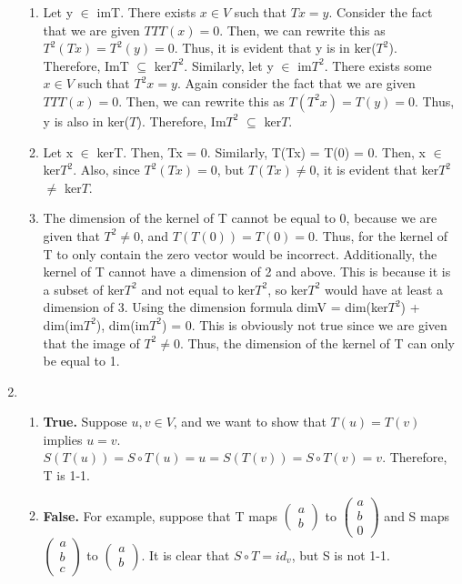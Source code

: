 \documentclass{article}
\begin{document}
\begin{enumerate}
\begin{enumerate}
\item Let y $\in$ imT. There exists $x \in V$ such that $Tx = y$. Consider the fact that we are given $TTT(x) = 0$. Then, we can rewrite this as $T^2(Tx) = T^2(y) = 0$. Thus, it is evident that y is in ker($T^2$). Therefore, ImT $\subseteq$ ker$T^2$. Similarly, let y $\in$ im$T^2$. There exists some $x \in V$ such that $T^2x = y$. Again consider the fact that we are given $TTT(x) = 0$. Then, we can rewrite this as $T(T^2x) = T(y) = 0$. Thus, y is also in ker($T$). Therefore, Im$T^2$ $\subseteq$ ker$T$.

\item Let x $\in$ kerT. Then, Tx = 0. Similarly, T(Tx) = T(0) = 0. Then, x $\in$ ker$T^2$. Also, since $T^2(Tx) = 0$, but $T(Tx) \neq 0$, it is evident that ker$T^2$ $\neq$ ker$T$.

\item The dimension of the kernel of T cannot be equal to 0, because we are given that $T^2 \neq 0$, and $T(T(0)) = T(0) = 0$. Thus, for the kernel of T to only contain the zero vector would be incorrect. Additionally, the kernel of T cannot have a dimension of 2 and above. This is because it is a subset of ker$T^2$ and not equal to ker$T^2$, so ker$T^2$ would have at least a dimension of 3. Using the dimension formula dimV = dim(ker$T^2$) + dim(im$T^2$), dim(im$T^2$) = 0. This is obviously not true since we are given that the image of $T^2 \neq 0$. Thus, the dimension of the kernel of T can only be equal to 1.

\end{enumerate}

\item

\begin{enumerate}

\item \textbf{True.} Suppose $u,v \in V$, and we want to show that $T(u) = T(v)$ implies $u = v$. $S(T(u)) = S \circ T(u) = u = S(T(v)) = S \circ T(v) = v$. Therefore, T is 1-1.

\item \textbf{False.} For example, suppose that T maps $\left(\begin{array}{c} a \\ b \end{array}\right)$ to $\left(\begin{array}{c} a \\ b \\ 0 \end{array}\right)$ and S maps $\left(\begin{array}{c} a \\ b \\ c \end{array}\right)$ to $\left(\begin{array}{c} a \\ b \end{array}\right)$. It is clear that $S \circ T = id_v$, but S is not 1-1.


\end{enumerate}
\end{enumerate}
\end{document}
